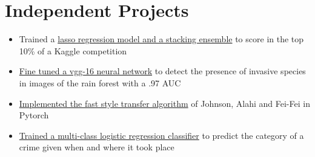 \documentclass[10pt]{article}
\begin{document}
	\section{Independent Projects}
		\begin{itemize}[noitemsep]
			\item Trained a \href{https://github.com/ryankresse/ames_housing}{lasso regression model and a stacking ensemble} to score in the top 10\% of a Kaggle competition
			\item \href{https://github.com/ryankresse/invasive_species}{Fine tuned a vgg-16 neural network} to detect the presence of invasive species in images of the rain forest with a .97 AUC
			\item \href{https://github.com/ryankresse/fast_style_transfer_pytorch}{Implemented the fast style transfer algorithm} of Johnson, Alahi and Fei-Fei in Pytorch
			\item \href{https://github.com/ryankresse/sf-crime}{Trained a multi-class logistic regression classifier} to predict the category of a crime given when and where it took place
		\end{itemize}
		\begin{comment}
		\begin{itemize}[noitemsep]
			\item Fast-style transfer
				\begin{itemize}[noitemsep]
					\item Implemented the fast-style transfer algorithm of .. in pytorch
				\end{itemize}
			\item Ames Housing Predictions
				\begin{itemize}[noitemsep]
					\item Trained .. to predict housing prices in Ames Iowa
				\end{itemize}
			\item Invasive species image classification
				\begin{itemize}[noitemsep]
					\item Trained a convolutional neural network to detect whether invasive species in images of the rain forest
				\end{itemize}
					
			\item San Francisco Crime
				\begin{itemize}[noitemsep]
					\item Predicted the category of individual crimes given attributes like where and when they occurred
				\end{itemize}			
		\end{itemize}
		\end{comment}
\end{document}
